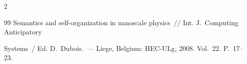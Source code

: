 \begin{multicols}{2}
{{\begin{thebibliography}{99}
Semantics and self-organization in nanoscale physics~// Int. J.~Computing Anticipatory 


Systems~/ Ed. D.~Dubois.~--- Liege, Belgium: HEC-ULg, 2008. Vol.~22. P.~17--23.













































































\end{thebibliography}}}
\end{multicols}
